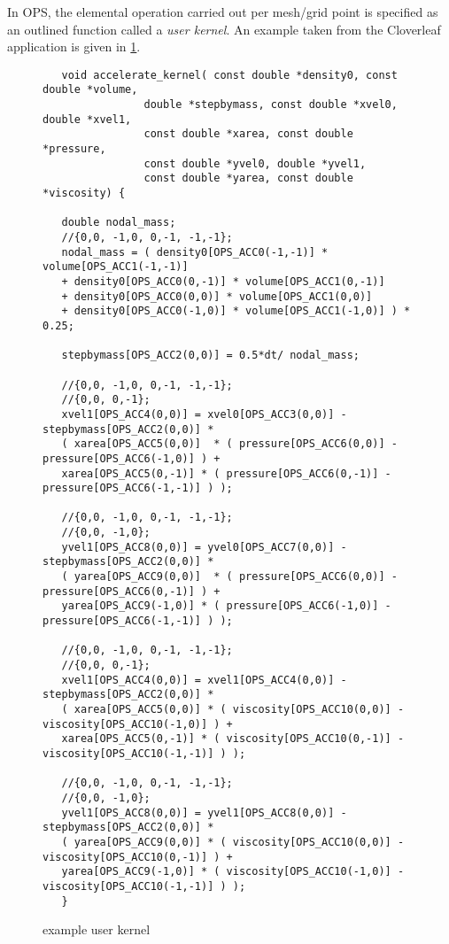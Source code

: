 \documentclass[11pt]{article}
\begin{document}
\noindent In OPS, the elemental operation carried out per mesh/grid point is specified as an outlined function called
a \textit{user kernel}. An example taken from the Cloverleaf application is given in \figurename{ \ref{fig:example}}.\\
\begin{figure}[!h]\small
\begin{verbatim}
   void accelerate_kernel( const double *density0, const double *volume,
                double *stepbymass, const double *xvel0, double *xvel1,
                const double *xarea, const double *pressure,
                const double *yvel0, double *yvel1,
                const double *yarea, const double *viscosity) {

   double nodal_mass;
   //{0,0, -1,0, 0,-1, -1,-1};
   nodal_mass = ( density0[OPS_ACC0(-1,-1)] * volume[OPS_ACC1(-1,-1)]
   + density0[OPS_ACC0(0,-1)] * volume[OPS_ACC1(0,-1)]
   + density0[OPS_ACC0(0,0)] * volume[OPS_ACC1(0,0)]
   + density0[OPS_ACC0(-1,0)] * volume[OPS_ACC1(-1,0)] ) * 0.25;

   stepbymass[OPS_ACC2(0,0)] = 0.5*dt/ nodal_mass;

   //{0,0, -1,0, 0,-1, -1,-1};
   //{0,0, 0,-1};
   xvel1[OPS_ACC4(0,0)] = xvel0[OPS_ACC3(0,0)] - stepbymass[OPS_ACC2(0,0)] *
   ( xarea[OPS_ACC5(0,0)]  * ( pressure[OPS_ACC6(0,0)] - pressure[OPS_ACC6(-1,0)] ) +
   xarea[OPS_ACC5(0,-1)] * ( pressure[OPS_ACC6(0,-1)] - pressure[OPS_ACC6(-1,-1)] ) );

   //{0,0, -1,0, 0,-1, -1,-1};
   //{0,0, -1,0};
   yvel1[OPS_ACC8(0,0)] = yvel0[OPS_ACC7(0,0)] - stepbymass[OPS_ACC2(0,0)] *
   ( yarea[OPS_ACC9(0,0)]  * ( pressure[OPS_ACC6(0,0)] - pressure[OPS_ACC6(0,-1)] ) +
   yarea[OPS_ACC9(-1,0)] * ( pressure[OPS_ACC6(-1,0)] - pressure[OPS_ACC6(-1,-1)] ) );

   //{0,0, -1,0, 0,-1, -1,-1};
   //{0,0, 0,-1};
   xvel1[OPS_ACC4(0,0)] = xvel1[OPS_ACC4(0,0)] - stepbymass[OPS_ACC2(0,0)] *
   ( xarea[OPS_ACC5(0,0)] * ( viscosity[OPS_ACC10(0,0)] - viscosity[OPS_ACC10(-1,0)] ) +
   xarea[OPS_ACC5(0,-1)] * ( viscosity[OPS_ACC10(0,-1)] - viscosity[OPS_ACC10(-1,-1)] ) );

   //{0,0, -1,0, 0,-1, -1,-1};
   //{0,0, -1,0};
   yvel1[OPS_ACC8(0,0)] = yvel1[OPS_ACC8(0,0)] - stepbymass[OPS_ACC2(0,0)] *
   ( yarea[OPS_ACC9(0,0)] * ( viscosity[OPS_ACC10(0,0)] - viscosity[OPS_ACC10(0,-1)] ) +
   yarea[OPS_ACC9(-1,0)] * ( viscosity[OPS_ACC10(-1,0)] - viscosity[OPS_ACC10(-1,-1)] ) );
   }
\end{verbatim}
\caption{\small example user kernel}
\normalsize\vspace{-0pt}\label{fig:example}
\end{figure}\\\\\\\\
\end{document}
